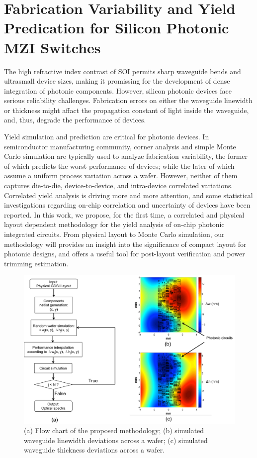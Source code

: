 \documentclass[journal]{spie}
\begin{document}
\section{Fabrication Variability and Yield Predication for Silicon Photonic MZI Switches}
\label{sec:variability}
The high refractive index contrast of SOI permits sharp waveguide bends and ultrasmall device sizes, making it promissing for the development of dense integration of photonic components. However, silicon photonic devices face serious reliability challenges. Fabrication errors on either the waveguide linewidth or thickness might affact the propagation constant of light inside the waveguide, and, thus, degrade the performance of devices. 

Yield simulation and prediction are critical for photonic devices. In semiconductor manufacturing community, corner analysis and simple Monte Carlo simulation are typically used to analyze fabrication variability, the former of which predicts the worst performance of devices; while the later of which assume a uniform process variation across a wafer. However, neither of them captures die-to-die, device-to-device, and intra-device correlated variations. Correlated yield analysis is driving more and more attention, and some statistical investigations regarding on-chip correlation \cite{lukas14:OFC,hochberg:wafer} and uncertainty of devices \cite{MIT:uncertainty} have been reported. In this work, we propose, for the first time, a correlated and physical layout dependent methodology for the yield analysis of on-chip photonic integrated circuits. From physical layout to Monte Carlo simulation, our methodology will provides an insight into the significance of compact layout for photonic designs, and offers a useful tool for post-layout verification and power trimming estimation.

\begin{figure}[h]
    \centering
    \label{flow_chart}\includegraphics[width=\linewidth]{flow_chart.pdf}
    \caption{(a) Flow chart of the proposed methodology; (b) simulated waveguide linewidth deviations across a wafer; (c) simulated waveguide thickness deviations across a wafer.}
    \label{flow_chart}  
\end{figure}
\end{document}
